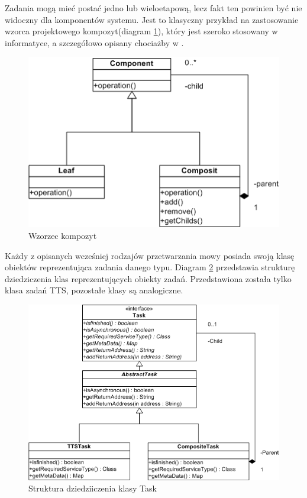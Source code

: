 Zadania mogą mieć postać jedno lub wieloetapową, lecz fakt ten powinien być nie widoczny dla komponentów systemu. Jest to klasyczny przykład na zastosowanie wzorca projektowego kompozyt(diagram \ref{fig:composite_pattern}), który jest szeroko stosowany w informatyce, a szczegółowo opisany chociażby w \cite{gamma1995}.

\begin{figure}[!h]
	\centering
	\includegraphics[scale=0.7]{composit_pattern.png}
	\caption{Wzorzec kompozyt}\label{fig:composite_pattern}
\end{figure}

Każdy z opisanych wcześniej rodzajów przetwarzania mowy posiada swoją klasę obiektów reprezentująca zadania danego typu. Diagram \ref {fig:task_class_hierarchy} przedstawia strukturę dziedziczenia klas reprezentujących obiekty zadań. Przedstawiona została tylko klasa zadań TTS, pozostałe klasy są analogiczne. 

\begin{figure}[!h]
	\centering
	\includegraphics[scale=0.7]{tasks_hierarhy.png}
	\caption{Struktura dziedziiczenia klasy Task}\label{fig:task_class_hierarchy}
\end{figure}


